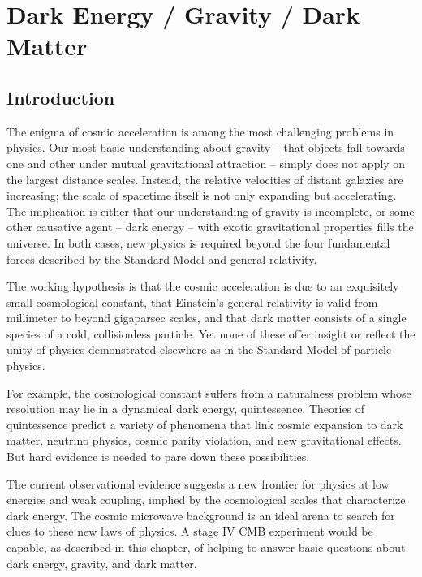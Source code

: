  
\chapter{Dark Energy / Gravity / Dark Matter}
\renewcommand*\thesection{\arabic{section}}

\def\gtrsim{\raise-.75ex\hbox{$\buildrel>\over\sim$}}

\section{Introduction}

The enigma of cosmic acceleration is among the most challenging problems in physics. Our most basic understanding about gravity -- that objects fall towards one and other under mutual gravitational attraction -- simply does not apply on the largest distance scales. Instead, the relative velocities of distant galaxies are increasing; the scale of spacetime itself is not only expanding but accelerating. The implication is either that our understanding of gravity is incomplete, or some other causative agent -- dark energy -- with exotic gravitational properties fills the universe. In both cases, new physics is required beyond the four fundamental forces described by the Standard Model and general relativity.

The working hypothesis is that the cosmic acceleration is due to an exquisitely small cosmological constant, that Einstein's general relativity is valid from millimeter to beyond gigaparsec scales, and that dark matter consists of a single species of a cold, collisionless particle. Yet none of these offer insight or reflect the unity of physics demonstrated elsewhere as in the Standard Model of particle physics.

For example, the cosmological constant suffers from a naturalness problem whose resolution may lie in a dynamical dark energy, quintessence. Theories of quintessence predict a variety of phenomena that link cosmic expansion to dark matter, neutrino physics, cosmic parity violation, and new gravitational effects. But hard evidence is needed to pare down these possibilities.

The current observational evidence suggests a new frontier for physics at low energies and weak coupling, implied by the cosmological scales that characterize dark energy. The cosmic microwave background is an ideal arena to search for clues to these new laws of physics. A stage IV CMB experiment would be capable, as described in this chapter, of helping to answer basic questions about dark energy, gravity, and dark matter.

